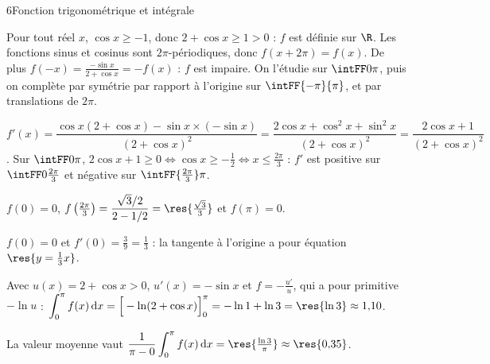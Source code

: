 \begin{corrigeBac}{6}{Fonction trigonométrique et intégrale}
\begin{questions}
  \item Pour tout réel $x$, $\cos x\geq-1$, donc $2+\cos x\geq1>0$ : $f$ est définie sur $\R$. Les fonctions sinus et cosinus sont
    $2\pi$-périodiques, donc $f(x+2\pi)=f(x)$. De plus $f(-x)=\frac{-\sin x}{2+\cos x}=-f(x)$ : $f$ est impaire. On l'étudie sur
    $\intFF0\pi$, puis on complète par symétrie par rapport à l'origine sur $\intFF{-\pi}{\pi}$, et par translations de $2\pi$. \pts{1 pt}
  \item $f'(x)=\dfrac{\cos x(2+\cos x)-\sin x\times(-\sin x)}{(2+\cos x)^{2}}=\dfrac{2\cos x+\cos^{2}x+\sin^{2}x}{(2+\cos x)^{2}}
    =\dfrac{2\cos x+1}{(2+\cos x)^{2}}$. Sur $\intFF0\pi$, $2\cos x+1\geq0\iff\cos x\geq-\frac12\iff x\leq\frac{2\pi}{3}$ :
    $f'$ est positive sur $\intFF0{\frac{2\pi}3}$ et négative sur $\intFF{\frac{2\pi}3}\pi$. 
  \item $f(0)=0$, $f\left(\frac{2\pi}{3}\right)=\dfrac{\sqrt3/2}{2-1/2}=\res{\tfrac{\sqrt3}{3}}$ et $f(\pi)=0$.
\begin{center}
\begin{tableau}
\end{tableau}
\end{center}
    \pts{1 pt}
  \item $f(0)=0$ et $f'(0)=\frac{3}{9}=\frac13$ : la tangente à l'origine a pour équation $\res{y=\tfrac13x}$. 
\end{questions}
\begin{questions}[resume]
  \item Avec $u(x)=2+\cos x>0$, $u'(x)=-\sin x$ et $f=-\frac{u'}{u}$, qui a pour primitive $-\ln u$ :
    $\displaystyle\int_0^{\pi}f(x)\,\mathrm{d}x=\Big[-\ln(2+\cos x)\Big]_0^{\pi}=-\ln1+\ln3=\res{\ln3}\approx1{,}10$. 
  \item La valeur moyenne vaut $\dfrac1{\pi-0}\displaystyle\int_0^{\pi}f(x)\,\mathrm{d}x=\res{\tfrac{\ln3}{\pi}}\approx\res{0{,}35}$. 
\end{questions}
\end{corrigeBac}
